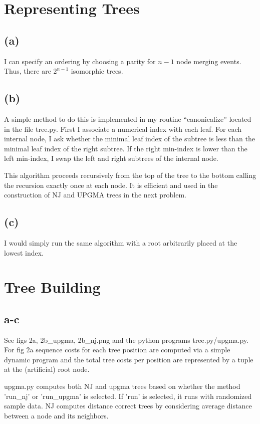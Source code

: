 \documentclass[12pt,draft,a4paper]{article}
\begin{document}

\setlength{\parindent}{0in}
\setlength{\parskip}{1ex}

\section{Representing Trees}
\subsection*{(a)}
I can specify an ordering by choosing a parity for $n-1$ node merging events. Thus, there are $2^{n-1}$ isomorphic trees.
\subsection*{(b)}
A simple method to do this is implemented in my routine ``canonicalize'' located in the file tree.py. First I associate a numerical index with each leaf. For each internal node, I ask whether the minimal leaf index of the subtree is less than the minimal leaf index of the right subtree. If the right min-index is lower than the left min-index, I swap the left and right subtrees of the internal node.

This algorithm proceeds recursively from the top of the tree to the bottom calling the recursion exactly once at each node. It is efficient and used in the construction of NJ and UPGMA trees in the next problem.
\subsection*{(c)}
I would simply run the same algorithm with a root arbitrarily placed at the lowest index.
\section{Tree Building}
\subsection*{a-c}
See figs 2a, 2b\_upgma, 2b\_nj.png and the python programs tree.py/upgma.py. For fig 2a sequence costs for each tree position are computed via a simple dynamic program and the total tree costs per position are represented by a tuple at the (artificial) root node.

upgma.py computes both NJ and upgma trees based on whether the method 'run\_nj' or 'run\_upgma' is selected. If 'run' is selected, it runs with randomized sample data. NJ computes distance correct trees by considering average distance between a node and its neighbors.
\pagebreak
\end{document}
